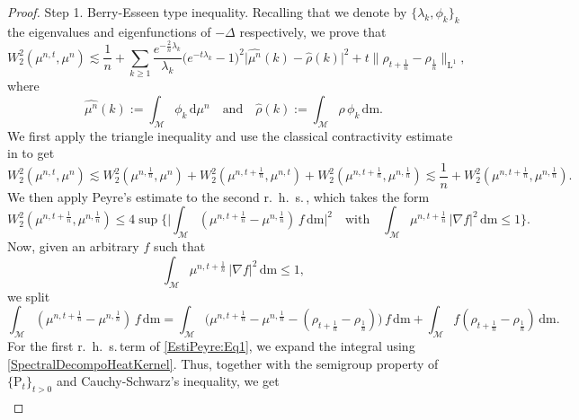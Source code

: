 \documentclass[11pt,a4paper,oneside]{amsart}
\numberwithin{equation}{section}
\newcommand{\dd}{\mathrm{d}}
\newcommand{\LL}{\mathrm{L}}
\newcommand{\rhs}{r.~h.~s.\,}
\newcommand{\m}{\mathrm{m}}
\begin{document}
\begin{proof}
{\sc Step 1. Berry-Esseen type inequality. }Recalling that we denote by $\{\lambda_k,\phi_k\}_k$ the eigenvalues and eigenfunctions of $-\Delta$ respectively, we prove that 
%
\begin{equation}\label{SmoothingIneg}
%
W^2_2(\mu^{n,t},\mu^n)\lesssim \frac{1}{n}+\sum_{k\geq 1} \frac{e^{-\frac{2}{n}\lambda_k}}{\lambda_k}\big(e^{-t\lambda_k}-1\big)^2\vert\widehat{\mu^n}(k)-\widehat{\rho}(k)\vert^2+t\|\rho_{t+\frac{1}{n}}-\rho_{\frac{1}{n}}\|_{\LL^1},
%
\end{equation}
%
where 
%
$$\widehat{\mu^n}(k):=\int_{\mathcal{M}}\phi_k\,\dd\mu^n \quad \text{and}\quad \widehat{\rho}(k):=\int_{\mathcal{M}}\rho\,\phi_k\,\dd\m.$$
%
We first apply the triangle inequality and use the classical contractivity estimate in \cite[Theorem 3]{erbar2015equivalence} to get
%
\begin{equation}\label{EstiPeyre:Eq4}
%
W^2_2(\mu^{n,t},\mu^n)\lesssim W^2_2(\mu^{n,\frac{1}{n}},\mu^{n})+W^2_2(\mu^{n,t+\frac{1}{n}},\mu^{n,t})+W^2_2(\mu^{n,t+\frac{1}{n}},\mu^{n,\frac{1}{n}})\lesssim \frac{1}{n}+W^2_2(\mu^{n,t+\frac{1}{n}},\mu^{n,\frac{1}{n}}).
%
\end{equation}
%
We then apply Peyre's estimate \cite{peyre2018comparison} to the second \rhs, which takes the form
%
\begin{equation}\label{PeyreLemma}
%
W^2_2(\mu^{n,t+\frac{1}{n}},\mu^{n,\frac{1}{n}})\leq 4\sup\bigg\{\Big\vert\int_{\mathcal{M}}(\mu^{n,t+\frac{1}{n}}-\mu^{n,\frac{1}{n}})\,f\,\dd\m\Big\vert^2\quad\text{with}\quad \int_{\mathcal{M}}\mu^{n,t+\frac{1}{n}}\,\vert\nabla f\vert^2\,\dd\m\leq 1\bigg\}.
%
\end{equation}
%
Now, given an arbitrary $f$ such that 
%
\begin{equation}\label{Boundtestfunctionf}
%
\int_{\mathcal{M}}\mu^{n,t+\frac{1}{n}}\,\vert\nabla f\vert^2\,\dd\m\leq 1,
%
\end{equation}
%
we split
%
\begin{equation}\label{EstiPeyre:Eq1}
%
\int_{\mathcal{M}}(\mu^{n,t+\frac{1}{n}}-\mu^{n,\frac{1}{n}})\, f\,\dd\m=\int_{\mathcal{M}}\big(\mu^{n,t+\frac{1}{n}}-\mu^{n,\frac{1}{n}}-(\rho_{t+\frac{1}{n}}-\rho_{\frac{1}{n}})\big)\, f\,\dd\m+\int_{\mathcal{M}}f(\rho_{t+\frac{1}{n}}-\rho_{\frac{1}{n}})\,\dd\m.
%
\end{equation}
%
For the first \rhs term of \eqref{EstiPeyre:Eq1}, we expand the integral using \eqref{SpectralDecompoHeatKernel}. Thus, together with the semigroup property of $\{\mathrm{P}_t\}_{t>0}$ and Cauchy-Schwarz's inequality, we get
%
\begin{align*}

\end{align*}
\end{proof}
\end{document}
